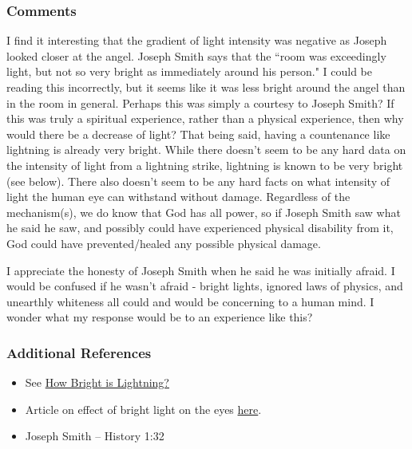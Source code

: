 \documentclass[12pt]{report}
\begin{document}
\subsubsection{Comments\label{js:comments5}}
I find it interesting that the gradient of light intensity was negative as Joseph looked closer at the angel.  Joseph Smith says that the ``room was exceedingly light, but not so very bright as immediately around his person."  I could be reading this incorrectly, but it seems like it was less bright around the angel than in the room in general.  Perhaps this was simply a courtesy to Joseph Smith?  If this was truly a spiritual experience, rather than a physical experience, then why would there be a decrease of light?  That being said, having a countenance like lightning is already very bright.  While there doesn't seem to be any hard data on the intensity of light from a lightning strike, lightning is known to be very bright (see  below).  There also doesn't seem to be any hard facts on what intensity of light the human eye can withstand without damage.  Regardless of the mechanism(s), we do know that God has all power, so if Joseph Smith saw what he said he saw, and possibly could have experienced physical disability from it, God could have prevented/healed any possible physical damage.

I appreciate the honesty of Joseph Smith when he said he was initially afraid.  I would be confused if he wasn't afraid - bright lights, ignored laws of physics, and unearthly whiteness all could and would be concerning to a human mind.  I wonder what my response would be to an experience like this?

\subsubsection{Additional References\label{js:references5}}
\begin{itemize}
\item See \href{http://academlib.com/5778/education/bright_lightning}{How Bright is Lightning?}
\item Article on effect of bright light on the eyes \href{https://www.quora.com/What-is-the-maximum-light-intensity-that-a-human-eye-can-withstand-without-being-damaged}{here}.
\item Joseph Smith -- History 1:32
\end{itemize}
\end{document}
